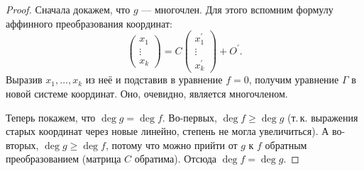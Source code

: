 \begin{proof}
    Сначала докажем, что $g$ --- многочлен. Для этого вспомним формулу аффинного преобразования координат:
    $$
    \begin{pmatrix}
        x_1\\
        \vdots\\
        x_k
    \end{pmatrix} = C
    \begin{pmatrix}
        x_1^\prime\\
        \vdots\\
        x_k^\prime
    \end{pmatrix} + O^\prime.
    $$
    Выразив $x_1, \ldots, x_k$ из неё и подставив в уравнение $f = 0$, получим уравнение $\Gamma$ в новой системе координат. Оно, очевидно, является многочленом.

    Теперь покажем, что $\deg g = \deg f$. Во-первых, $\deg f \geqslant \deg g$ (т.\,к. выражения старых координат через новые линейно, степень не могла увеличиться). А во-вторых, $\deg g \geqslant \deg f$, потому что можно прийти от $g$ к $f$ обратным преобразованием (матрица $C$ обратима). Отсюда $\deg f = \deg g$.
\end{proof}


